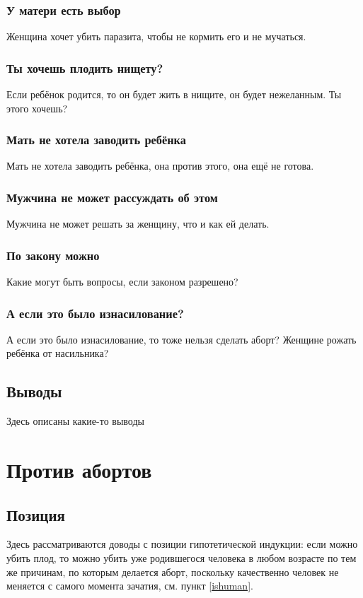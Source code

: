 \documentclass[a4paper,12pt]{report}
\begin{document}
    \section{У матери есть выбор}
        Женщина хочет убить паразита, чтобы не кормить его и не мучаться.
    \section{Ты хочешь плодить нищету?}
        Если ребёнок родится, то он будет жить в нищите, он будет нежеланным. Ты этого хочешь?
    \section{Мать не хотела заводить ребёнка}
        Мать не хотела заводить ребёнка, она против этого, она ещё не готова.
    \section{Мужчина не может рассуждать об этом}
        Мужчина не может решать за женщину, что и как ей делать.   
    \section{По закону можно}
        Какие могут быть вопросы, если законом разрешено?
    \section{А если это было изнасилование?}
        А если это было изнасилование, то тоже нельзя сделать аборт? Женщине рожать ребёнка от насильника?


\chapter{Выводы}
Здесь описаны какие-то выводы


\part{Против абортов}
\chapter{Позиция}
Здесь рассматриваются доводы с позиции гипотетической индукции: если можно убить плод, то можно убить 
уже родившегося человека в любом возрасте по тем же причинам, по которым делается аборт,
поскольку качественно человек не меняется с самого момента зачатия, см. пункт \ref{ishuman}.
\end{document}
